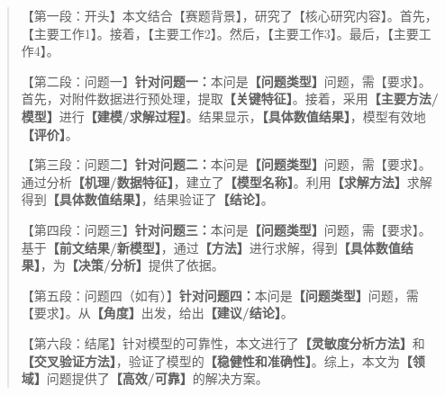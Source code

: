 
\begin{abstract}

【第一段：开头】本文结合【赛题背景】，研究了【核心研究内容】。首先，【主要工作1】。接着，【主要工作2】。然后，【主要工作3】。最后，【主要工作4】。

【第二段：问题一】\textbf{针对问题一：}本问是\textbf{【问题类型】}问题，需【要求】。首先，对附件数据进行预处理，提取\textbf{【关键特征】}。接着，采用\textbf{【主要方法/模型】}进行\textbf{【建模/求解过程】}。结果显示，\textbf{【具体数值结果】}，模型有效地\textbf{【评价】}。

【第三段：问题二】\textbf{针对问题二：}本问是\textbf{【问题类型】}问题，需【要求】。通过分析\textbf{【机理/数据特征】}，建立了\textbf{【模型名称】}。利用\textbf{【求解方法】}求解得到\textbf{【具体数值结果】}，结果验证了\textbf{【结论】}。

【第四段：问题三】\textbf{针对问题三：}本问是\textbf{【问题类型】}问题，需【要求】。基于\textbf{【前文结果/新模型】}，通过\textbf{【方法】}进行求解，得到\textbf{【具体数值结果】}，为\textbf{【决策/分析】}提供了依据。

【第五段：问题四（如有）】\textbf{针对问题四：}本问是\textbf{【问题类型】}问题，需【要求】。从\textbf{【角度】}出发，给出\textbf{【建议/结论】}。

【第六段：结尾】针对模型的可靠性，本文进行了\textbf{【灵敏度分析方法】}和\textbf{【交叉验证方法】}，验证了模型的\textbf{【稳健性和准确性】}。综上，本文为\textbf{【领域】}问题提供了\textbf{【高效/可靠】}的解决方案。

\label{abstract:end}

\end{abstract}

